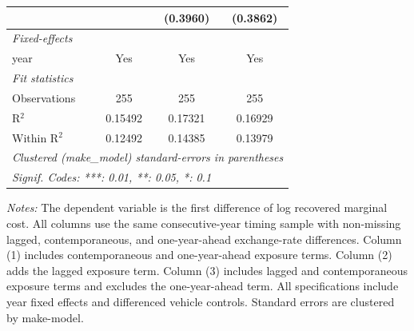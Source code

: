 \begin{table}[htbp]
\begin{tabular}{lccc}
                                                      &                  & (0.3960)               & (0.3862)\\
      \midrule
      \emph{Fixed-effects}\\
      year                                            & Yes              & Yes                    & Yes\\
      \midrule
      \emph{Fit statistics}\\
      Observations                                    & 255              & 255                    & 255\\
      R$^2$                                           & 0.15492          & 0.17321                & 0.16929\\
      Within R$^2$                                    & 0.12492          & 0.14385                & 0.13979\\
      \midrule \midrule
      \multicolumn{4}{l}{\emph{Clustered (make\_model) standard-errors in parentheses}}\\
      \multicolumn{4}{l}{\emph{Signif. Codes: ***: 0.01, **: 0.05, *: 0.1}}\\
   \end{tabular}
\vspace{0.25em}
\begin{minipage}{0.96\textwidth}
\footnotesize \textit{Notes:} The dependent variable is the first difference of log recovered marginal cost. All columns use the same consecutive-year timing sample with non-missing lagged, contemporaneous, and one-year-ahead exchange-rate differences. Column (1) includes contemporaneous and one-year-ahead exposure terms. Column (2) adds the lagged exposure term. Column (3) includes lagged and contemporaneous exposure terms and excludes the one-year-ahead term. All specifications include year fixed effects and differenced vehicle controls. Standard errors are clustered by make-model.
\end{minipage}
\end{table}
